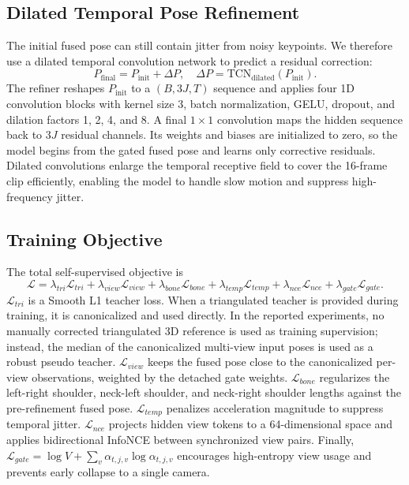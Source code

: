 \documentclass[runningheads]{llncs}
\begin{document}
\subsection{Dilated Temporal Pose Refinement}
The initial fused pose can still contain jitter from noisy keypoints. We therefore use a dilated temporal convolution network to predict a residual correction:
\begin{equation}
P_{\mathrm{final}}=P_{\mathrm{init}}+\Delta P,\quad
\Delta P=\mathrm{TCN}_{\mathrm{dilated}}(P_{\mathrm{init}}).
\label{equ:tcn}
\end{equation}
The refiner reshapes $P_{\mathrm{init}}$ to a $(B,3J,T)$ sequence and applies four 1D convolution blocks with kernel size 3, batch normalization, GELU, dropout, and dilation factors 1, 2, 4, and 8. A final $1\times1$ convolution maps the hidden sequence back to $3J$ residual channels. Its weights and biases are initialized to zero, so the model begins from the gated fused pose and learns only corrective residuals. Dilated convolutions enlarge the temporal receptive field to cover the 16-frame clip efficiently, enabling the model to handle slow motion and suppress high-frequency jitter.

\subsection{Training Objective}
The total self-supervised objective is
\begin{equation}
\mathcal{L}=\lambda_{tri}\mathcal{L}_{tri}+\lambda_{view}\mathcal{L}_{view}+\lambda_{bone}\mathcal{L}_{bone}+\lambda_{temp}\mathcal{L}_{temp}+\lambda_{nce}\mathcal{L}_{nce}+\lambda_{gate}\mathcal{L}_{gate}.
\label{equ:loss}
\end{equation}
$\mathcal{L}_{tri}$ is a Smooth L1 teacher loss. When a triangulated teacher is provided during training, it is canonicalized and used directly. In the reported experiments, no manually corrected triangulated 3D reference is used as training supervision; instead, the median of the canonicalized multi-view input poses is used as a robust pseudo teacher. $\mathcal{L}_{view}$ keeps the fused pose close to the canonicalized per-view observations, weighted by the detached gate weights. $\mathcal{L}_{bone}$ regularizes the left-right shoulder, neck-left shoulder, and neck-right shoulder lengths against the pre-refinement fused pose. $\mathcal{L}_{temp}$ penalizes acceleration magnitude to suppress temporal jitter. $\mathcal{L}_{nce}$ projects hidden view tokens to a 64-dimensional space and applies bidirectional InfoNCE between synchronized view pairs. Finally, $\mathcal{L}_{gate}=\log V + \sum_{v}\alpha_{t,j,v}\log\alpha_{t,j,v}$ encourages high-entropy view usage and prevents early collapse to a single camera.
\end{document}
